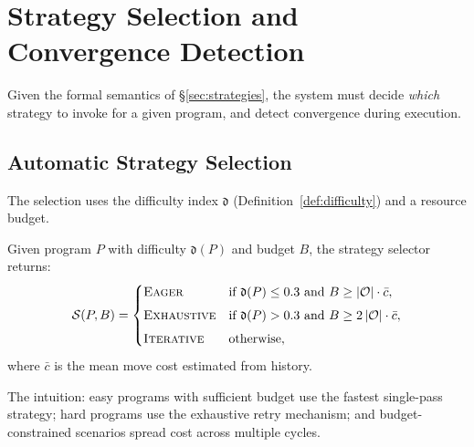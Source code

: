 \documentclass[11pt]{article}
\newcommand{\difficulty}{\mathfrak{d}}     %
\begin{document}
\section{Strategy Selection and Convergence Detection}
\label{sec:selection}

Given the formal semantics of \S\ref{sec:strategies}, the system must
decide \emph{which} strategy to invoke for a given program, and detect
convergence during execution.

\subsection{Automatic Strategy Selection}

The selection uses the difficulty index $\difficulty$
(Definition~\ref{def:difficulty}) and a resource budget.

\begin{definition}
  \label{def:stratselect}
  Given program $P$ with difficulty $\difficulty(P)$ and budget $B$,
  the strategy selector returns:
  \[
    \mathcal{S}(P, B) = \begin{cases}
      \textsc{Eager} & \text{if } \difficulty(P) \leq 0.3
        \text{ and } B \geq |\oblig| \cdot \bar{c}, \\[4pt]
      \textsc{Exhaustive} & \text{if } \difficulty(P) > 0.3
        \text{ and } B \geq 2\,|\oblig| \cdot \bar{c}, \\[4pt]
      \textsc{Iterative} & \text{otherwise},
    \end{cases}
  \]
  where $\bar{c}$ is the mean move cost estimated from history.
\end{definition}

The intuition: easy programs with sufficient budget use the fastest
single-pass strategy; hard programs use the exhaustive retry mechanism;
and budget-constrained scenarios spread cost across multiple cycles.
\end{document}
